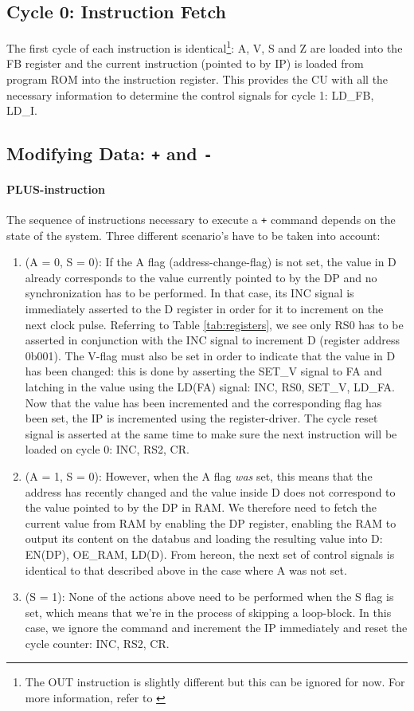 \subsection{Cycle 0: Instruction Fetch}
The first cycle of each instruction is identical\footnote{The OUT instruction is slightly different but this can be ignored for now. For more information, refer to \label{sec:??}}: A, V, S and Z are loaded into the FB register and the current instruction (pointed to by IP) is loaded from program ROM into the instruction register. This provides the CU with all the necessary information to determine the control signals for cycle 1: LD\_FB, LD\_I.

\subsection{Modifying Data: \texttt{+} and \texttt{-}} \label{sec:sequences:+-}
\paragraph{PLUS-instruction} The sequence of instructions necessary to execute a \texttt{+} command depends on the state of the system. Three different scenario's have to be taken into account:
\begin{enumerate}
\item (A = 0, S = 0): If the A flag (address-change-flag) is not set, the value in D already corresponds to the value currently pointed to by the DP and no synchronization has to be performed. In that case, its INC signal is immediately asserted to the D register in order for it to increment on the next clock pulse. Referring to Table \ref{tab:registers}, we see only RS0 has to be asserted in conjunction with the INC signal to increment D (register address 0b001). The V-flag must also be set in order to indicate that the value in D has been changed: this is done by asserting the SET\_V signal to FA and latching in the value using the LD(FA) signal: INC, RS0, SET\_V, LD\_FA. Now that the value has been incremented and the corresponding flag has been set, the IP is incremented using the register-driver. The cycle reset signal is asserted at the same time to make sure the next instruction will be loaded on cycle 0: INC, RS2, CR.
\item (A = 1, S = 0): However, when the A flag \emph{was} set, this means that the address has recently changed and the value inside D does not correspond to the value pointed to by the DP in RAM. We therefore need to fetch the current value from RAM by enabling the DP register, enabling the RAM to output its content on the databus and loading the resulting value into D: EN(DP), OE\_RAM, LD(D). From hereon, the next set of control signals is identical to that described above in the case where A was not set.
  \item (S = 1): None of the actions above need to be performed when the S flag is set, which means that we're in the process of skipping a loop-block. In this case, we ignore the command and increment the IP immediately and reset the cycle counter: INC, RS2, CR.
\end{enumerate}


